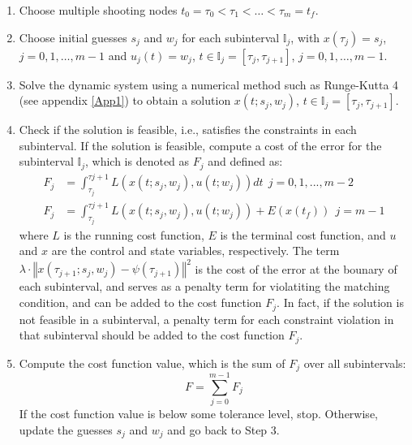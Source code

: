 \documentclass  [
  paper    = a4,
  BCOR     = 10mm,
  twoside,
  fontsize = 12pt,
  fleqn,
  toc      = bibnumbered,
  toc      = listofnumbered,
  numbers  = noendperiod,
  headings = normal,
  listof   = leveldown,
  version  = 3.03
]                                       {scrreprt}
\newcommand{\<}{\langle}
\renewcommand{\>}{\rangle}
\begin{document}
\begin{enumerate}
	\item Choose multiple shooting nodes $t_0 = \tau_0 < \tau_1 < \dots < \tau_m = t_f$.
	\item Choose initial guesses $s_j$ and $w_j$ for each subinterval $\mathbb{I}_j$, with $x(\tau_j) = s_j$, $j=0,1,\dots,m-1$ and $u_j(t) = w_j$, $t \in \mathbb{I}_j = [\tau_j,\tau_{j+1}]$, $j=0,1,\dots,m-1$.
	\item Solve the dynamic system using a numerical method such as Runge-Kutta 4 (see appendix \ref{App1}) to obtain a solution $x(t; s_j, w_j)$, $t\in\mathbb{I}_j = [\tau_j, \tau_{j+1}]$.
	\item Check if the solution is feasible, i.e., satisfies the constraints in each subinterval. If the solution is feasible, compute a cost of the error for the subinterval $\mathbb{I}_j$, which is denoted as $F_j$ and defined as:
	\begin{equation}\label{eq_PW_obj}
		\begin{aligned}
			F_j &= \int_{\tau_j}^{\tau{j+1}} L(x(t;s_j,w_j), u(t;w_j)) dt   \ \    j= 0, 1, ..., m-2 \\ 
			F_j  & = \int_{\tau_j}^{\tau{j+1}} L(x(t;s_j,w_j), u(t;w_j)) +  E (x(t_f))  \ \  j =m-1 
		\end{aligned}
	\end{equation}
	where $L$ is the running cost function, $E$ is the terminal cost function, and $u$ and $x$ are the control and state variables, respectively. The term $\lambda \cdot \left\Vert x(\tau_{j+1};s_j,w_j)-\psi(\tau_{j+1})\right\Vert^2$ is the cost of the error at the bounary of each subinterval, and serves as a penalty term for violatiting the matching condition, and can be added to the cost function $F_j$. In fact, if the solution is not feasible in a subinterval,  a penalty term for each constraint violation in that subinterval should be added to the cost function $F_j$.
	\item Compute the cost function value, which is the sum of $F_j$ over all subintervals:
	$$F = \sum_{j=0}^{m-1} F_j$$
	If the cost function value is below some tolerance level, stop. Otherwise, update the guesses $s_j$ and $w_j$ and go back to Step 3.
\end{enumerate}
\end{document}
